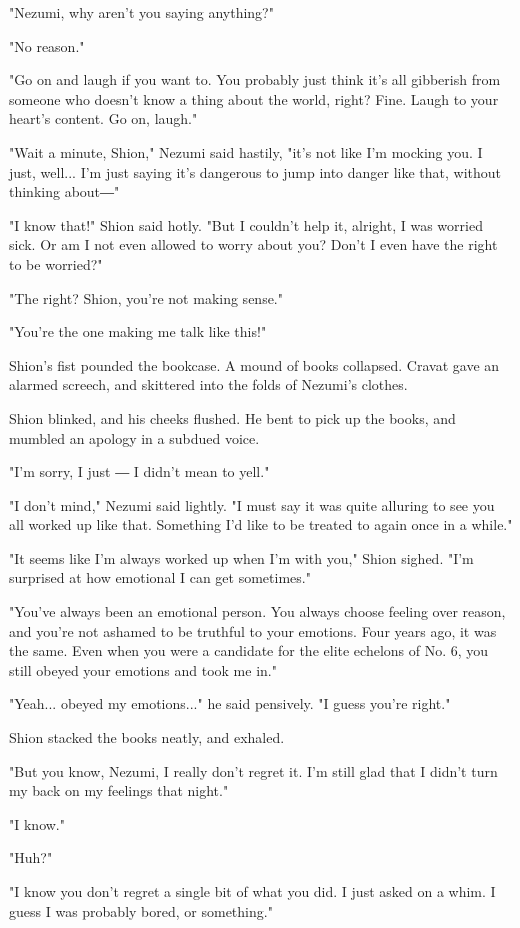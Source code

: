 "Nezumi, why aren't you saying anything?"

"No reason."

"Go on and laugh if you want to. You probably just think it's all
gibberish from someone who doesn't know a thing about the world, right?
Fine. Laugh to your heart's content. Go on, laugh."

"Wait a minute, Shion," Nezumi said hastily, "it's not like I'm mocking
you. I just, well... I'm just saying it's dangerous to jump into danger
like that, without thinking about―"

"I know that!" Shion said hotly. "But I couldn't help it, alright, I was
worried sick. Or am I not even allowed to worry about you? Don't I even
have the right to be worried?"

"The right? Shion, you're not making sense."

"You're the one making me talk like this!"

Shion's fist pounded the bookcase. A mound of books collapsed. Cravat
gave an alarmed screech, and skittered into the folds of Nezumi's
clothes.

Shion blinked, and his cheeks flushed. He bent to pick up the books, and
mumbled an apology in a subdued voice.

"I'm sorry, I just ― I didn't mean to yell."

"I don't mind," Nezumi said lightly. "I must say it was quite alluring
to see you all worked up like that. Something I'd like to be treated to
again once in a while."

"It seems like I'm always worked up when I'm with you," Shion sighed.
"I'm surprised at how emotional I can get sometimes."

"You've always been an emotional person. You always choose feeling over
reason, and you're not ashamed to be truthful to your emotions. Four
years ago, it was the same. Even when you were a candidate for the elite
echelons of No. 6, you still obeyed your emotions and took me in."

"Yeah... obeyed my emotions..." he said pensively. "I guess you're
right."

Shion stacked the books neatly, and exhaled.

"But you know, Nezumi, I really don't regret it. I'm still glad that I
didn't turn my back on my feelings that night."

"I know."

"Huh?"

"I know you don't regret a single bit of what you did. I just asked on a
whim. I guess I was probably bored, or something."

